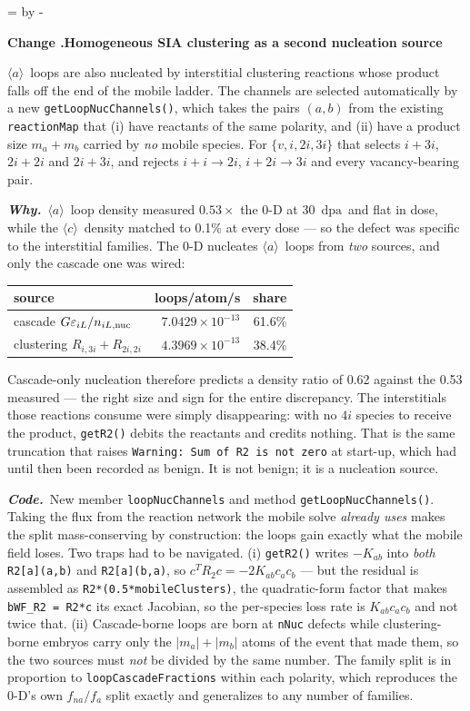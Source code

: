 \documentclass[11pt,a4paper]{article}
\newcommand{\code}[1]{\texttt{\small #1}}
\newcommand{\dpa}{\ensuremath{\mathrm{dpa}}}
\newcommand{\aloop}{\ensuremath{\langle a\rangle}}
\newcommand{\cloop}{\ensuremath{\langle c\rangle}}
\newcommand{\needlines}[1]{%
  \par\dimen0=\pagegoal \advance\dimen0 by -\pagetotal
  \ifdim\dimen0<#1\baselineskip \newpage \fi}
\newcounter{chg}
\newcommand{\change}[1]{%
  \needlines{4}%
  \refstepcounter{chg}%
  \par\medskip\noindent
  {\bfseries\boldmath Change \thechg.\quad #1}%
  \par\nobreak\smallskip}
\newcommand{\why}[1]{\par\noindent\textbf{\itshape Why.}\ #1\par}
\newcommand{\impact}[1]{\par\noindent\textbf{\itshape Code.}\ #1\par}
\begin{document}
\change{Homogeneous SIA clustering as a second nucleation source}
\label{chg:clustering}
\aloop\ loops are also nucleated by interstitial clustering reactions whose
product falls off the end of the mobile ladder. The channels are selected
automatically by a new \code{getLoopNucChannels()}, which takes the pairs
$(a,b)$ from the existing \code{reactionMap} that (i) have reactants of the
same polarity, and (ii) have a product size $m_a+m_b$ carried by \emph{no}
mobile species. For $\{v,i,2i,3i\}$ that selects $i{+}3i$, $2i{+}2i$ and
$2i{+}3i$, and rejects $i{+}i \rightarrow 2i$, $i{+}2i \rightarrow 3i$ and
every vacancy-bearing pair.
\why{\aloop\ loop density measured $0.53\times$ the 0-D at 30~\dpa\ and flat in
dose, while the \cloop\ density matched to 0.1\% at every dose --- so the
defect was specific to the interstitial families. The 0-D nucleates \aloop\
loops from \emph{two} sources, and only the cascade one was wired:

\begin{center}
\begin{tabular}{lrr}
\toprule
source & loops/atom/s & share \\
\midrule
cascade $G\varepsilon_{iL}/n_{iL,{\rm nuc}}$ & $7.0429\times10^{-13}$ & 61.6\% \\
clustering $R_{i,3i}+R_{2i,2i}$              & $4.3969\times10^{-13}$ & 38.4\% \\
\bottomrule
\end{tabular}
\end{center}

\noindent
Cascade-only nucleation therefore predicts a density ratio of 0.62 against the
0.53 measured --- the right size and sign for the entire discrepancy. The
interstitials those reactions consume were simply disappearing: with no $4i$
species to receive the product, \code{getR2()} debits the reactants and credits
nothing. That is the same truncation that raises
\code{Warning: Sum of R2 is not zero} at start-up, which had until then been
recorded as benign. It is not benign; it is a nucleation source.}
\impact{New member \code{loopNucChannels} and method
\code{getLoopNucChannels()}. Taking the flux from the reaction network the
mobile solve \emph{already uses} makes the split mass-conserving by
construction: the loops gain exactly what the mobile field loses. Two traps
had to be navigated. (i) \code{getR2()} writes $-K_{ab}$ into \emph{both}
\code{R2[a](a,b)} and \code{R2[a](b,a)}, so $c^{T}R_2 c = -2K_{ab}c_ac_b$ ---
but the residual is assembled as \code{R2*(0.5*mobileClusters)}, the
quadratic-form factor that makes \code{bWF\_R2 = R2*c} its exact Jacobian, so
the per-species loss rate is $K_{ab}c_ac_b$ and not twice that. (ii)
Cascade-borne loops are born at \code{nNuc} defects while clustering-borne
embryos carry only the $|m_a|+|m_b|$ atoms of the event that made them, so the
two sources must \emph{not} be divided by the same number. The family split is
in proportion to \code{loopCascadeFractions} within each polarity, which
reproduces the 0-D's own $f_{na}/f_a$ split exactly and generalizes to any
number of families.}
\end{document}
